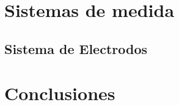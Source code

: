 %
%
%
%
%
%
%
%

\section{Sistemas de medida}


%
%
%
%
%
%
%
%
%
%
%
%
%
%
%
\subsection{Sistema de Electrodos}


\section{Conclusiones}
